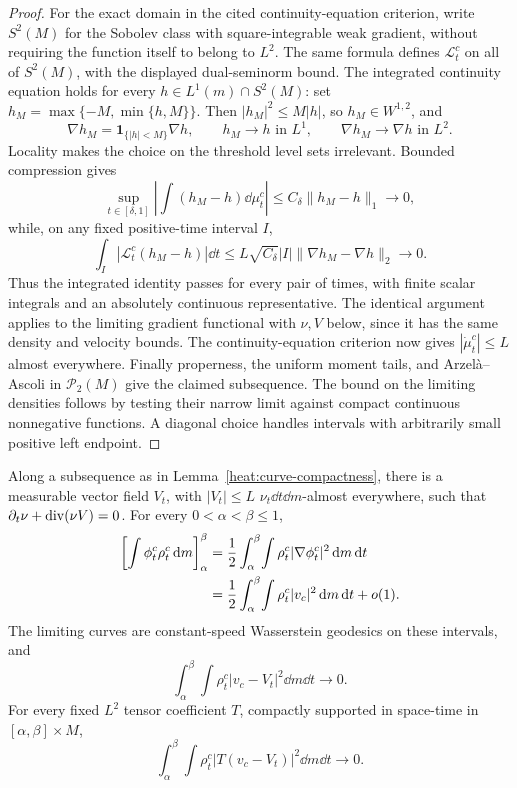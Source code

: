 \begin{proof}
For the exact domain in the cited continuity-equation
criterion, write \(S^2(M)\) for the Sobolev class with
square-integrable weak gradient, without requiring the
function itself to belong to \(L^2\). The same formula
defines \(\mathcal L_t^c\) on all of \(S^2(M)\), with the
displayed dual-seminorm bound. The integrated continuity
equation holds for every \(h\in L^1(m)\cap S^2(M)\): set
\(h_M=\max\{-M,\min\{h,M\}\}\). Then
\(|h_M|^2\le M|h|\), so \(h_M\in W^{1,2}\), and
\[
\nabla h_M=\mathbf1_{\{|h|<M\}}\nabla h,
\qquad
h_M\to h\text{ in }L^1,
\qquad
\nabla h_M\to\nabla h\text{ in }L^2.
\]
Locality makes the choice on the threshold level sets
irrelevant. Bounded compression gives
\[
\sup_{t\in[\delta,1]}
\left|\int(h_M-h)\dd\mu_t^c\right|
\le C_\delta\|h_M-h\|_1\longrightarrow0,
\]
while, on any fixed positive-time interval \(I\),
\[
\int_I|\mathcal L_t^c(h_M-h)|\dd t
\le L\sqrt{C_\delta}|I|
\|\nabla h_M-\nabla h\|_2\longrightarrow0.
\]
Thus the integrated identity passes for every pair of times,
with finite scalar integrals and an absolutely continuous
representative. The identical argument applies to the
limiting gradient functional with \(\nu,V\) below, since it
has the same density and velocity bounds. The
continuity-equation criterion now gives
\(|\dot\mu_t^c|\le L\) almost everywhere.
Finally properness, the uniform moment tails, and
Arzel\`a--Ascoli in \(\mathcal P_2(M)\) give the claimed
subsequence. The bound on the limiting densities follows by
testing their narrow limit against compact continuous
nonnegative functions. A diagonal choice handles intervals
with arbitrarily small positive left endpoint.
\end{proof}

\begin{lemma}
\label{heat:action-limit}
Along a subsequence as in
Lemma~\ref{heat:curve-compactness}, there is a measurable
vector field \(V_t\), with \(|V_t|\le L\)
\(\nu_t\dd t\dd m\)-almost everywhere, such that
\(\partial_t\nu+\operatorname{div}(\nu V)=0\). For every
\(0<\alpha<\beta\le1\),
\begin{align}
\label{heat:exact-action-identity}
\left[\int\phi_t^c\rho_t^c\,\mathrm d m\right]_\alpha^\beta
&=\frac12\int_\alpha^\beta\!\int
\rho_t^c|\nabla\phi_t^c|^2\,\mathrm d m\,\mathrm d t\notag\\
&=\frac12\int_\alpha^\beta\!\int
\rho_t^c|v_c|^2\,\mathrm d m\,\mathrm d t+o(1).
\end{align}
The limiting curves are constant-speed Wasserstein geodesics
on these intervals, and
\begin{equation}
\label{heat:strong-weighted-velocity}
\int_\alpha^\beta\!\int
\rho_t^c|v_c-V_t|^2\dd m\dd t\longrightarrow0.
\end{equation}
For every fixed \(L^2\) tensor coefficient \(T\), compactly
supported in space-time in \([\alpha,\beta]\times M\),
\begin{equation}
\label{heat:strong-coefficient-velocity}
\int_\alpha^\beta\!\int
\rho_t^c|T(v_c-V_t)|^2\dd m\dd t\longrightarrow0.
\end{equation}
\end{lemma}

